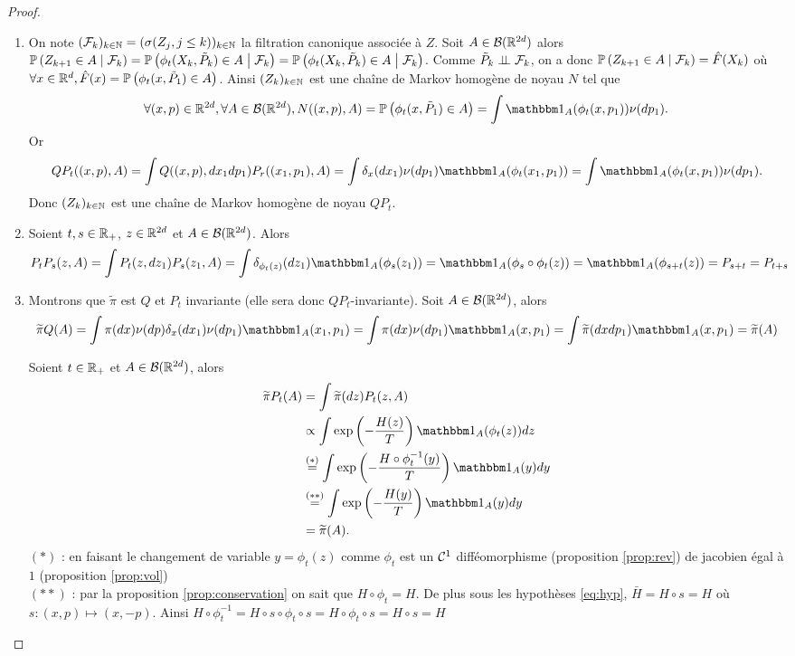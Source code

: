 \documentclass[10pt,a4paper]{article}
\begin{document}
\begin{proof}
	\begin{enumerate}
		\item On note $(\mathcal{F}_k)_{k \in \mathbb{N}} = (\sigma(Z_j, j\leq k))_{k \in \mathbb{N}}$ la filtration canonique associée à $Z$. Soit $A \in \mathcal{B}(\mathbb{R}^{2d})$ alors $\PP[Z_{k+1} \in A \given{\calF_k}] = \PP[\phi_t(X_k, \tilde{P}_k) \in A \given{\calF_k}] = \PP[\phi_t(X_k, \tilde{P}_k) \in A \given{\calF_k}]$. Comme $\tilde{P}_k \perp\!\!\!\perp \mathcal{F}_k$, on a donc $\PP[Z_{k+1} \in A \given{\calF_k}] = \hat{F}(X_k)$ où $\forall x \in \rset^d, \hat{F}(x) = \PP[\phi_t(x, \tilde{P}_1) \in A]$. Ainsi $(Z_k)_{k \in \mathbb{N}}$ est une chaîne de Markov homogène de noyau $N$ tel que
		$$
		\forall (x,p) \in \rset^{2d}, \forall A \in \calB(\rset^{2d}), N((x,p), A) = \PP[\phi_t(x, \tilde{P}_1) \in A] = \int \ind_A(\phi_t(x, p_1)) \nu(dp_1).
		$$
		Or
		$$
		Q P_t((x,p),A) = \int Q((x,p), dx_1dp_1) P_r((x_1, p_1), A) = \int \delta_x(dx_1) \nu(dp_1) \ind_A(\phi_t(x_1, p_1)) = \int \ind_A(\phi_t(x,p_1)) \nu(dp_1).
		$$
		Donc $(Z_k)_{k \in \mathbb{N}}$ est une chaîne de Markov homogène de noyau $QP_t$.

		\item Soient $t,s \in \mathbb{R}_+$, $z \in \mathbb{R}^{2d}$ et $A \in \mathcal{B}(\mathbb{R}^{2d})$. Alors
		$$
		P_t P_s (z, A) = \int P_t(z, dz_1) P_s(z_1, A) = \int \delta_{\phi_t(z)}(dz_1) \ind_A(\phi_s(z_1)) = \ind_A(\phi_s \circ \phi_t(z)) = \ind_A(\phi_{s+t}(z)) = P_{s+t} = P_{t+s}
		$$

		\item Montrons que $\widetilde{\pi}$ est $Q$ et $P_t$ invariante (elle sera donc $QP_t$-invariante). Soit $A \in \mathcal{B}(\mathbb{R}^{2d})$, alors
		$$
		\widetilde{\pi} Q (A) = \int \pi(dx) \nu(dp) \delta_x(dx_1) \nu(dp_1) \ind_A(x_1, p_1) = \int \pi(dx) \nu(dp_1) \ind_A(x, p_1) = \int \widetilde{\pi}(dxdp_1) \ind_A(x, p_1) = \widetilde{\pi}(A) 
		$$

		Soient $t \in \mathbb{R}_+$ et $A \in \mathcal{B}(\mathbb{R}^{2d})$, alors
		\begin{align*}
		\widetilde{\pi} P_t (A)
		&= \int \widetilde{\pi}(dz) P_t(z, A) \\
		&\propto \int \exp \left(-\frac{H(z)}{T} \right) \ind_A(\phi_t(z)) dz\\
		&\overset{(*)}{=} \int \exp \left(-\frac{H \circ \phi_t^{-1}(y)}{T} \right) \ind_A(y) dy \\
		&\overset{(**)}{=} \int \exp \left(-\frac{H(y)}{T} \right) \ind_A(y) dy \\
		&= \widetilde{\pi}(A).
		\end{align*}
		$(*)$ : en faisant le changement de variable $y = \phi_t(z)$ comme $\phi_t$ est un $\mathcal{C}^1$ difféomorphisme (proposition \ref{prop:rev}) de jacobien égal à $1$ (proposition \ref{prop:vol}) \\
		$(**)$ : par la proposition \ref{prop:conservation} on sait que $H \circ \phi_t = H$. De plus sous les hypothèses \eqref{eq:hyp}, $\bar{H} = H \circ s = H$ où $s : (x,p) \mapsto (x, -p)$. Ainsi $H \circ \phi_t^{-1} = H \circ s \circ \phi_t \circ s = H \circ \phi_t \circ s = H \circ s = H$ 
	\end{enumerate}
\end{proof}
\end{document}
